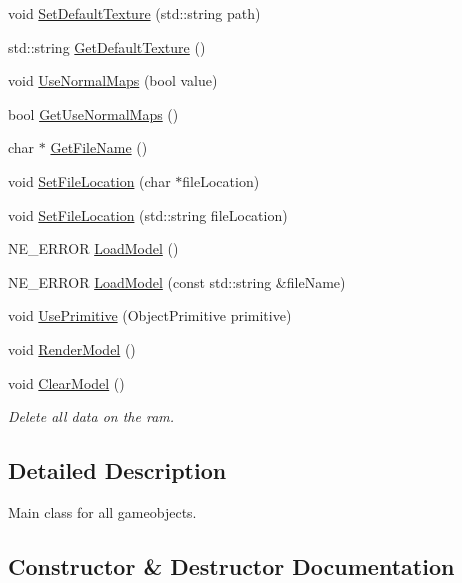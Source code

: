 \begin{DoxyCompactItemize}
void \mbox{\hyperlink{class_game_object_af2dfbb6e1219c9483d549beb8f60f81b}{Set\+Default\+Texture}} (std\+::string path)
\item 
std\+::string \mbox{\hyperlink{class_game_object_aab74d8c9a731b51be641209670b172f7}{Get\+Default\+Texture}} ()
\item 
void \mbox{\hyperlink{class_game_object_ab59900eba23ba9d4d07ce727332d3c0b}{Use\+Normal\+Maps}} (bool value)
\item 
bool \mbox{\hyperlink{class_game_object_af6f452c0d3f1d97f5573d6dc1f428424}{Get\+Use\+Normal\+Maps}} ()
\item 
char $\ast$ \mbox{\hyperlink{class_game_object_a5e449ed9a13ab543b02aca997ba475d9}{Get\+File\+Name}} ()
\item 
void \mbox{\hyperlink{class_game_object_a5c7584253378347ac1a0da0909073e07}{Set\+File\+Location}} (char $\ast$file\+Location)
\item 
void \mbox{\hyperlink{class_game_object_a4df7e5070a936fdcfc340f230d3a92ca}{Set\+File\+Location}} (std\+::string file\+Location)
\item 
N\+E\+\_\+\+E\+R\+R\+OR \mbox{\hyperlink{class_game_object_acfd40d131da4847e23f2e01fb6751399}{Load\+Model}} ()
\item 
N\+E\+\_\+\+E\+R\+R\+OR \mbox{\hyperlink{class_game_object_a14f2f975d6c5005ee5fb9c4665cbfc4b}{Load\+Model}} (const std\+::string \&file\+Name)
\item 
void \mbox{\hyperlink{class_game_object_a530897ca5fe14017bae2790f49b46e95}{Use\+Primitive}} (Object\+Primitive primitive)
\item 
void \mbox{\hyperlink{class_game_object_ab4c2468f179f258168c6af5369172f81}{Render\+Model}} ()
\item 
\mbox{\label{class_game_object_aba04bb334ea9b02b61eda560d8128fc5}} 
void \mbox{\hyperlink{class_game_object_aba04bb334ea9b02b61eda560d8128fc5}{Clear\+Model}} ()
\begin{DoxyCompactList}\small\item\em Delete all data on the ram. \end{DoxyCompactList}\end{DoxyCompactItemize}


\subsection{Detailed Description}
Main class for all gameobjects. 

\subsection{Constructor \& Destructor Documentation}
\mbox{\label{class_game_object_a0348e3ee2e83d56eafca7a3547f432c4}} 

